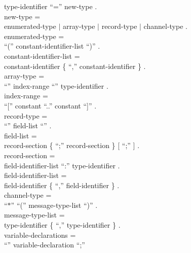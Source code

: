 \begin{grammar}
    {\GB}type-identifier ``='' new-type .                 \\
  {\GA}new-type =                                         \\
    {\GB}enumerated-type $|$ array-type $|$
         record-type $|$ channel-type .                   \\
  {\GA}enumerated-type =                                  \\
    {\GB}``('' constant-identifier-list ``)'' .           \\
  {\GA}constant-identifier-list =                         \\
    {\GB}constant-identifier
           \{ ``,'' constant-identifier \} .              \\
  {\GA}array-type =                                       \\
    {\GB}``{\Array}'' index-range ``{\Of}''
           type-identifier .                              \\
  {\GA}index-range =                                      \\
    {\GB}``['' constant ``..'' constant ``]'' .           \\
  {\GA}record-type =                                      \\
    {\GB}``{\Record}'' field-list ``{\End}'' .            \\
  {\GA}field-list =                                       \\
    {\GB}record-section
           \{ ``;'' record-section \} [ ``;'' ] .         \\
  {\GA}record-section =                                   \\
    {\GB}field-identifier-list ``:'' type-identifier .    \\
  {\GA}field-identifier-list =                            \\
    {\GB}field-identifier
           \{ ``,'' field-identifier \} .                 \\
  {\GA}channel-type =                                     \\
    {\GB}``$*$'' ``('' message-type-list ``)'' .          \\
  {\GA}message-type-list =                                \\
    {\GB}type-identifier \{ ``,'' type-identifier \} .    \\
  {\GA}variable-declarations =                            \\
    {\GB}``{\Var}'' variable-declaration ``;''

\end{grammar}
